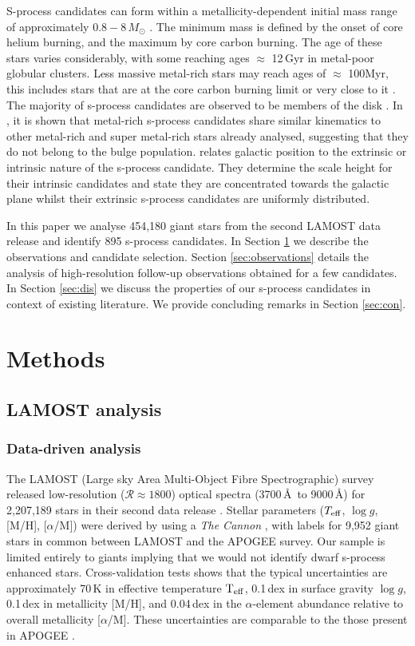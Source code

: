 \documentclass[a4paper,fleqn,usenatbib]{mnras}
\begin{document}
S-process candidates can form within a metallicity-dependent initial mass range of approximately $0.8 - 8\,M_{\odot}$ \citep{karakas2016cp}. The minimum mass is defined by the onset of core helium burning, and the maximum by core carbon burning. The age of these stars varies considerably, with some reaching ages $\approx$ 12\,Gyr in metal-poor globular clusters. Less massive metal-rich stars may reach ages of $\approx$ 100Myr, this includes stars that are at the core carbon burning limit or very close to it \citep[e.g.,][]{whitelock2013}. The majority of s-process candidates are observed to be members of the disk \citep{jorissen1993,gomez1997,mennessier1997}. In \citet{pereira2011}, it is shown that metal-rich s-process candidates share similar kinematics to other metal-rich and super metal-rich stars already analysed, suggesting that they do not belong to the bulge population. \cite{jorissen1993} relates galactic position to the extrinsic or intrinsic nature of the s-process candidate. They determine the scale height for their intrinsic candidates and state they are concentrated towards the galactic plane whilst their extrinsic s-process candidates are uniformly distributed.

In this paper we analyse 454,180 giant stars from the second LAMOST data release \citep{luo2015} and identify 895 s-process candidates. In Section \ref{sec:methods} we describe the observations and candidate selection. Section \ref{sec:observations} details the analysis of high-resolution follow-up observations obtained for a few candidates. In Section \ref{sec:dis} we discuss the properties of our s-process candidates in context of existing literature. We provide concluding remarks in Section \ref{sec:con}.


\section{Methods} \label{sec:methods}
\subsection{LAMOST analysis}
\subsubsection{Data-driven analysis}
The LAMOST (Large sky Area Multi-Object Fibre Spectrographic) survey released low-resolution ($\mathcal{R} \approx 1800$) optical spectra (3700\,\AA\ to 9000\,\AA) for 2,207,189 stars in their second data release \citep{luo2015}. Stellar parameters ($T_{\rm eff}$, $\log{g}$, [M/H], [$\alpha$/M]) were derived by \citep{ho2017} using a \emph{The Cannon} \citet{ness2016}, with labels for 9,952 giant stars in common between LAMOST and the APOGEE survey. Our sample is limited entirely to giants implying that we would not identify dwarf s-process enhanced stars. Cross-validation tests shows that the typical uncertainties are approximately 70\,K in effective temperature $\rm T_{\rm eff}$, 0.1\,dex in surface gravity $\log{g}$, 0.1\,dex in metallicity [M/H], and 0.04\,dex in the $\alpha$-element abundance relative to overall metallicity [$\alpha$/M]. These uncertainties are comparable to the those present in APOGEE \citep{alam2015}.
\end{document}
